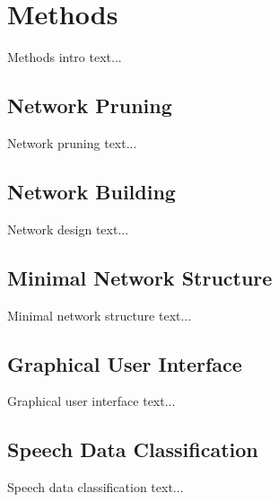 \chapter{Methods} \label{chap:methods}
Methods intro text...

\section{Network Pruning} \label{sec:network_pruning}
Network pruning text...

\section{Network Building} \label{sec:network_building}
Network design text...

\section{Minimal Network Structure} \label{sec:minimal_network_structure}
Minimal network structure text...

\section{Graphical User Interface} \label{sec:graphical_user_interface}
Graphical user interface text...

\section{Speech Data Classification} \label{sec:speech_data_classification}
Speech data classification text...